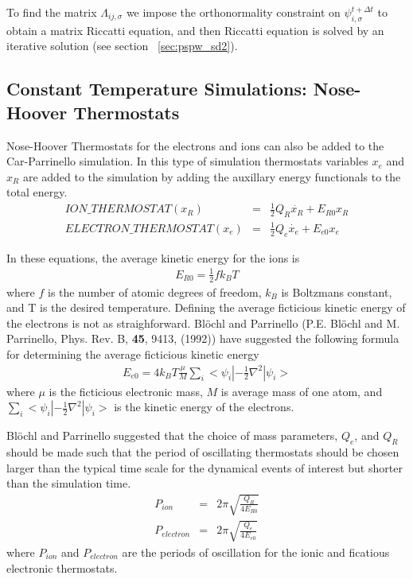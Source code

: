 \noindent
To find the matrix $\Lambda_{ij,\sigma}$ we impose the orthonormality
constraint on $\psi_{i,\sigma}^{t+\Delta t}$ to obtain a
matrix Riccatti equation, and then Riccatti equation is solved by an iterative
solution (see section ~\ref{sec:pspw_sd2}).


\subsection{Constant Temperature Simulations: Nose-Hoover Thermostats}
\label{sec:pspw_nose}

Nose-Hoover Thermostats for the electrons and ions can also be added to the 
Car-Parrinello simulation.  In this type of simulation thermostats variables $x_e$ and $x_R$ 
are added to the simulation by adding the auxillary energy functionals to the total energy.
\begin{eqnarray}
ION\_THERMOSTAT(x_R)      &=&  \frac{1}{2} Q_R \dot{x_R} + E_{R0}x_R \\ 
ELECTRON\_THERMOSTAT(x_e) &=&  \frac{1}{2} Q_e \dot{x_e} + E_{e0}x_e 
\end{eqnarray}

In these equations, the average kinetic energy for the ions is
\begin{eqnarray}
E_{R0} = \frac{1}{2} f k_B T
\end{eqnarray}
where $f$ is the number of atomic degrees of freedom, $k_B$ is 
Boltzmans constant, and T is the desired temperature.  Defining
the average ficticious kinetic energy of the electrons is not as straighforward.
Bl\"{o}chl and Parrinello 
(P.E. Bl\"{o}chl and M. Parrinello, Phys. Rev. B, \textbf{45}, 9413, (1992)) 
have suggested the following formula for determining
the average ficticious kinetic energy
\begin{eqnarray}
E_{e0} = 4 k_B T \frac{\mu}{M} \sum_i <\psi_i|-\frac{1}{2} \nabla^2 |\psi_i>
\end{eqnarray}
where $\mu$ is the ficticious electronic mass, $M$ is average mass of one atom,
and $\sum_i <\psi_i|-\frac{1}{2} \nabla^2 |\psi_i>$ is the kinetic energy of the
electrons.

Bl\"{o}chl and Parrinello suggested that the choice of mass parameters, 
$Q_e$, and $Q_R$ should be made such that the period of oscillating thermostats 
should be chosen larger than the typical time scale for the dynamical events of 
interest but shorter than the simulation time.  
\begin{eqnarray}
P_{ion} &=& 2\pi \sqrt{\frac{Q_R}{4E_{R0}}}\\
P_{electron} &=& 2\pi \sqrt{\frac{Q_e}{4E_{e0}}}
\end{eqnarray}
where $P_{ion}$ and $P_{electron}$ are the periods of oscillation for the ionic and ficatious
electronic thermostats.  


